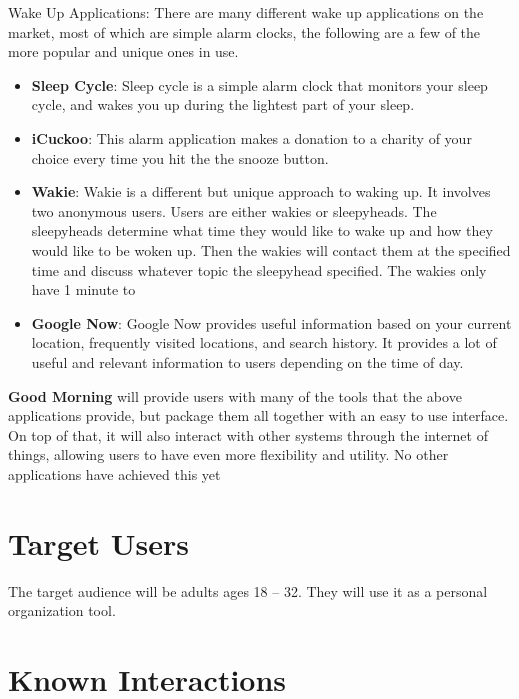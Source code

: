 \documentclass[11pt]{article}
\begin{document}
Wake Up Applications: There are many different wake up applications on the market, most
of which are simple alarm clocks, the following are a few of the more popular and unique ones in use.
\begin{itemize}
\item
    \textbf{Sleep Cycle}: Sleep cycle is a simple alarm clock that monitors your sleep
    cycle, and wakes you up during the lightest part of your sleep.
\item
    \textbf{iCuckoo}: This alarm application makes a donation to a charity of your choice every time you hit the
    the snooze button.
\item
    \textbf{Wakie}: Wakie is a different but unique approach to waking up. It
    involves two anonymous users. Users are either wakies or sleepyheads. 
    The sleepyheads determine what time they would like to wake up and how they would
    like to be woken up. Then the wakies will contact them at the specified time and 
    discuss whatever topic the sleepyhead specified. The wakies only have 1 minute to
\item
	\textbf{Google Now}: Google Now provides useful information based on your current location, frequently
	visited locations, and search history. It provides a lot of useful and relevant information to users 
	depending on the time of day.
\end{itemize}

\textbf{Good Morning} will provide users with many of the tools that the above applications
provide, but package them all together with an easy to use interface. On top of that, it will also
interact with other systems through the internet of things, allowing users to have even more flexibility 
and utility. No other applications have achieved this yet



%
\section{Target Users}\label{target-users}

The target audience will be adults ages 18 -- 32. They will use it as a
personal organization tool.


%
\section{Known Interactions}\label{known-interactions}
\end{document}

